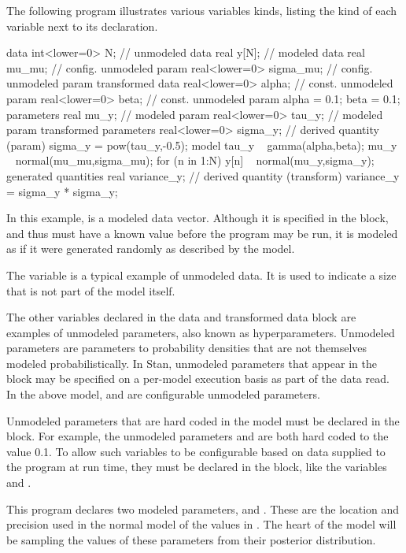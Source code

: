 The following program illustrates various variables kinds, listing the
kind of each variable next to its declaration.
%
\begin{stancode}
data {
  int<lower=0> N;           // unmodeled data
  real y[N];                // modeled data
  real mu_mu;               // config. unmodeled param
  real<lower=0> sigma_mu;   // config. unmodeled param
}
transformed data {
  real<lower=0> alpha;      // const. unmodeled param
  real<lower=0> beta;       // const. unmodeled param
  alpha = 0.1;
  beta = 0.1;
}
parameters {
  real mu_y;                // modeled param
  real<lower=0> tau_y;      // modeled param
}
transformed parameters {
  real<lower=0> sigma_y;    // derived quantity (param)
  sigma_y = pow(tau_y,-0.5);
}
model {
  tau_y ~ gamma(alpha,beta);
  mu_y ~ normal(mu_mu,sigma_mu);
  for (n in 1:N)
    y[n] ~ normal(mu_y,sigma_y);
}
generated quantities {
  real variance_y;       // derived quantity (transform)
  variance_y = sigma_y * sigma_y;
}
\end{stancode}
%
In this example,  is a modeled data vector.  Although it is
specified in the  block, and thus must have a known value
before the program may be run, it is modeled as if it were generated
randomly as described by the model.

The variable  is a typical example of unmodeled data.  It is
used to indicate a size that is not part of the model itself.

The other variables declared in the data and transformed data block are
examples of unmodeled parameters, also known as hyperparameters.
Unmodeled parameters are parameters to probability densities that are
not themselves modeled probabilistically.  In Stan, unmodeled
parameters that appear in the  block may be specified on a
per-model execution basis as part of the data read.  In the above
model,  and  are configurable unmodeled
parameters.

Unmodeled parameters that are hard coded in the model must be declared
in the  block.  For example, the unmodeled
parameters  and  are both hard coded to the
value 0.1.  To allow such variables to be configurable based on data
supplied to the program at run time, they must be declared in the
 block, like the variables  and
.

This program declares two modeled parameters,  and
.  These are the location and precision used in the normal
model of the values in .  The heart of the model will be
sampling the values of these parameters from their posterior
distribution.

